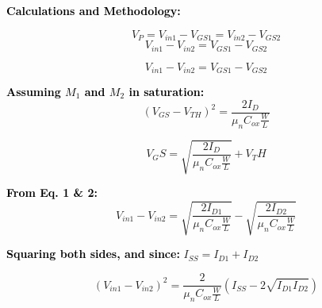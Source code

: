 \textbf{\textcolor{black}{Calculations and Methodology:}}
\vspace{0.3cm}

\noindent
\[
V_P = V_{in1} - V_{GS1} = V_{in2} - V_{GS2}
\]
\[
V_{in1} - V_{in2} = V_{GS1} - V_{GS2}
\]

\begin{tcolorbox}[colback=white,colframe=black,title=]
\begin{equation}
V_{in1} - V_{in2} = V_{GS1} - V_{GS2}
\end{equation}
\end{tcolorbox}

\vspace{0.5cm}

\noindent
\textbf{\textcolor{black}{Assuming $M_1$ and $M_2$ in saturation:}}
\[
(V_{GS} - V_{TH})^2 = \frac{2 I_D}{\mu_n C_{ox} \frac{W}{L}}
\]

\begin{tcolorbox}[colback=white,colframe=black,title=]
\begin{equation}
{V_GS} = \sqrt{\frac{2 I_D}{\mu_n C_{ox} \frac{W}{L}}} + {V_TH}
\end{equation}
\end{tcolorbox}


\vspace{0.5cm}

\noindent
\textbf{\textcolor{black}{From Eq. 1 \& 2:}}
\[
V_{in1} - V_{in2} = \sqrt{\frac{2 I_{D1}}{\mu_n C_{ox} \frac{W}{L}}} 
- \sqrt{\frac{2 I_{D2}}{\mu_n C_{ox} \frac{W}{L}}}
\]

\vspace{0.5cm}

\noindent
\textbf{\textcolor{black}{Squaring both sides, and since:}} \quad $I_{SS} = I_{D1} + I_{D2}$

\begin{tcolorbox}[colback=white,colframe=black,title=]
\begin{equation}
{(V_{in1} - V_{in2})^2 = \frac{2}{\mu_n C_{ox} \frac{W}{L}} \left (I_{SS} - 2 \sqrt{I_{D1} I_{D2}} \right)}
\end{equation}
\end{tcolorbox}

\vspace{0.5cm}

